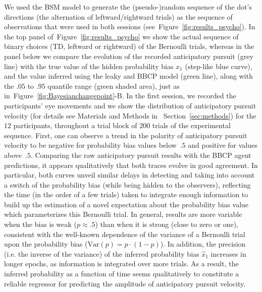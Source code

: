 \documentclass[10pt,letterpaper]{article}
\newcommand{\seeFig}[1]{Figure~\ref{fig:#1}}
\newcommand{\seeSec}[1]{Section~\ref{sec:#1}}
\begin{document}
We used the BSM model to generate the (pseudo-)random sequence of
the dot's directions (the alternation of leftward/rightward trials)
as the sequence of observations that were used in both sessions
(see~\seeFig{results_psycho}).
In the top panel  of~\seeFig{results_psycho} we show the actual sequence of binary choices
(TD, leftward or rightward) of the Bernoulli trials,
whereas in the panel below we compare the evolution of the recorded anticipatory pursuit (grey line) with
the true value of the hidden probability bias $x_1$ (step-like blue curve),
and the value inferred using the leaky and BBCP model (green line),
along with the $.05$ to $.95$ quantile range (green shaded area),
just as in~\seeFig{Bayesianchangepoint}-B.
In the first session, we recorded the participants' eye movements and
we show the distribution of anticipatory pursuit velocity (for details see Materials and Methods in ~\seeSec{methods})
for the $12$ participants, throughout a trial block of $200$ trials of the experimental sequence.
First, one can observe a trend in the polarity of anticipatory pursuit velocity
to be negative for probability bias values below~$.5$ and positive for values above~$.5$.
Comparing the raw anticipatory pursuit results with the BBCP agent predictions,
it appears qualitatively that both traces evolve in good agreement.
In particular, both curves unveil similar delays in detecting and
taking into account a switch of the probability bias (while being hidden to the observers),
reflecting the time (in the order of a few trials) taken to integrate enough information
to build up the estimation of a novel expectation about the probability bias value
which parameterizes this Bernoulli trial.
In general, results are more variable when the bias is weak ($p\approx .5$)
than when it is strong (close to zero or one),
consistent with the well-known dependence of the variance of a Bernoulli trial
upon the probability bias ($\textrm{Var}(p)= p \cdot (1-p)$).
In addition, the precision (i.e. the inverse of the variance)
of the inferred probability bias $\hat{x}_1$ increases
in longer epochs, as information is integrated over more trials.
As a result, the inferred probability as a function of time
seems qualitatively to constitute a reliable regressor
for predicting the amplitude of anticipatory pursuit velocity.
\end{document}
